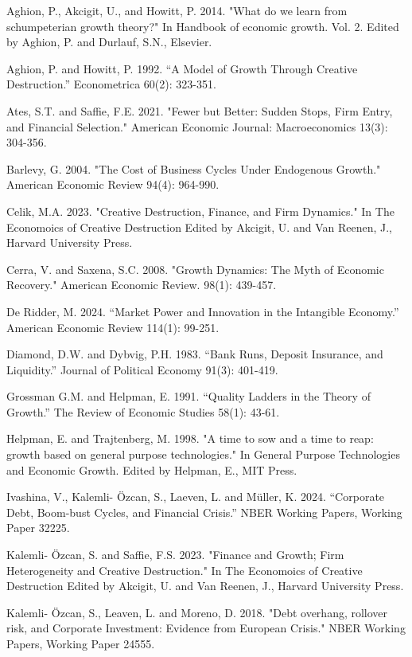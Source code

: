 \documentclass{article}
\begin{document}
\begin{thebibliography}{9}
    \item Aghion, P., Akcigit, U., and Howitt, P. 2014. "What do we learn from schumpeterian growth theory?" In Handbook of economic growth. Vol. 2. Edited by Aghion, P. and Durlauf, S.N., Elsevier.
    \item Aghion, P. and Howitt, P. 1992. “A Model of Growth Through Creative Destruction.” Econometrica 60(2): 323-351.
    \item Ates, S.T. and Saffie, F.E. 2021. "Fewer but Better: Sudden Stops, Firm Entry, and Financial Selection." American Economic Journal: Macroeconomics 13(3): 304-356.
    \item Barlevy, G. 2004. "The Cost of Business Cycles Under Endogenous Growth." American Economic Review 94(4): 964-990.
    \item Celik, M.A. 2023. "Creative Destruction, Finance, and Firm Dynamics." In The Economoics of Creative Destruction Edited by Akcigit, U. and Van Reenen, J., Harvard University Press.
    \item Cerra, V. and Saxena, S.C. 2008. "Growth Dynamics: The Myth of Economic Recovery." American Economic Review. 98(1): 439-457.
    \item De Ridder, M. 2024. “Market Power and Innovation in the Intangible Economy.” American Economic Review 114(1): 99-251.
    \item Diamond, D.W. and Dybvig, P.H. 1983. “Bank Runs, Deposit Insurance, and Liquidity.” Journal of Political Economy 91(3): 401-419.
    \item Grossman G.M. and Helpman, E. 1991. “Quality Ladders in the Theory of Growth.” The Review of Economic Studies 58(1): 43-61.
    \item Helpman, E. and Trajtenberg, M. 1998. "A time to sow and a time to reap: growth based on general purpose
technologies." In General Purpose Technologies and Economic Growth. Edited by Helpman, E., MIT Press.
    \item Ivashina, V., Kalemli- Özcan, S., Laeven, L. and Müller, K. 2024. “Corporate Debt, Boom-bust Cycles, and Financial Crisis.” NBER Working Papers, Working Paper 32225.
    \item Kalemli- Özcan, S. and Saffie, F.S. 2023. "Finance and Growth; Firm Heterogeneity and Creative Destruction." In The Economoics of Creative Destruction Edited by Akcigit, U. and Van Reenen, J., Harvard University Press.
    \item Kalemli- Özcan, S., Leaven, L. and Moreno, D. 2018. "Debt overhang, rollover risk, and Corporate Investment: Evidence from European Crisis." NBER Working Papers, Working Paper 24555.

\end{thebibliography}
\end{document}

